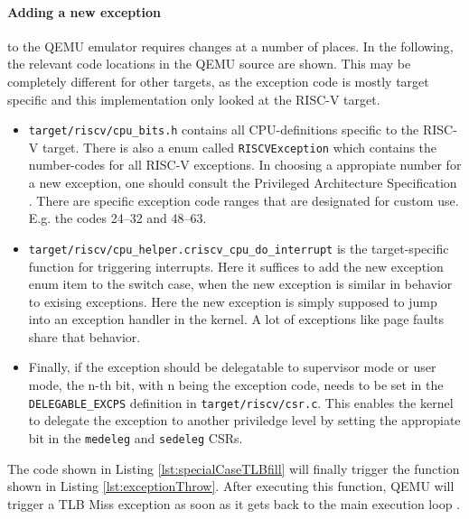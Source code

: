\paragraph{Adding a new exception}to the QEMU emulator requires changes at a number of places. In the following,
the relevant code locations in the QEMU source \cite{QEMUSource2024} are shown.
This may be completely different for other targets, as the exception code is mostly target specific and
this implementation only looked at the RISC-V target.
\begin{itemize}
    \item \texttt{target/riscv/cpu\_bits.h} contains all CPU-definitions specific to the RISC-V target.
          There is also a enum called \texttt{RISCVException} which contains the number-codes for all RISC-V exceptions.
          In choosing a appropiate number for a new exception, one should consult the Privileged Architecture Specification \cite{RISCVInstructionSet}.
          There are specific exception code ranges that are designated for custom use. E.g. the codes 24--32 and 48--63.
    \item \texttt{target/riscv/cpu\_helper.c\:riscv\_cpu\_do\_interrupt\(\)} is the target-specific function
          for triggering interrupts. Here it suffices to add the new exception enum item to the switch case, when
          the new exception is similar in behavior to exising exceptions.
          Here the new exception is simply supposed to jump into an exception handler in the kernel. A lot of exceptions
          like page faults share that behavior.
    \item Finally, if the exception should be delegatable to supervisor mode or user mode, the n-th bit,
          with n being the exception code, needs to be set in the \texttt{DELEGABLE\_EXCPS} definition in \texttt{target/riscv/csr.c}.
          This enables the kernel to delegate the exception to another priviledge level by setting the appropiate
          bit in the \texttt{medeleg} and \texttt{sedeleg} CSRs.
\end{itemize}

The code shown in Listing \ref{lst:specialCaseTLBfill} will finally trigger the function shown in
Listing \ref{lst:exceptionThrow}. After executing this function, QEMU will trigger a TLB Miss exception as soon
as it gets back to the main execution loop \cite{QEMUSource2024}.

